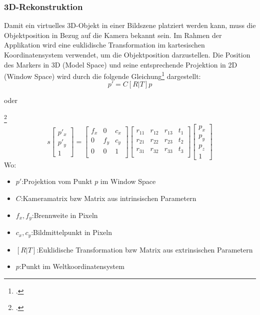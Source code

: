 \subsubsection{3D-Rekonstruktion}\label{sssec2drekonstruktion}
Damit ein virtuelles 3D-Objekt in einer Bildszene platziert werden kann, muss die Objektposition in Bezug auf die Kamera bekannt sein. Im Rahmen der Applikation wird eine euklidische Transformation im kartesischen Koordinatensystem verwendet, um die Objektposition darzustellen. Die Position des Markers in 3D (Model Space) und seine entsprechende Projektion in 2D (Window Space) wird durch die folgende Gleichung\footcite[Vgl.][\ac{S} 76]{Baggio2012} dargestellt:
\Large $$p' = C[R|T]p$$
\normalsize
\centerline{oder}\footcite{opencv3DReconstruction}
\begin{equation*}
s
\begin{bmatrix}
p'_{x}\\
p'_{y}\\
1
\end{bmatrix}
=
\begin{bmatrix}
f_{x} & 0 & c_{x}\\
0 & f_{y} & c_{y}\\
0 & 0 & 1\\
\end{bmatrix}
\begin{bmatrix}
r_{11} & r_{12} & r_{13} & t_{1}\\
r_{21} & r_{22} & r_{23} & t_{2}\\
r_{31} & r_{32} & r_{33} & t_{3}\\
\end{bmatrix}
\begin{bmatrix}
p_{x}\\
p_{y}\\
p_{z}\\
1
\end{bmatrix}
\end{equation*}
Wo:
\begin{itemize}[label=]
    \item $p'$:\hspace{1.1cm}Projektion vom Punkt $p$ im Window Space
    \item $C$:\hspace{1.1cm}Kameramatrix \acs{bzw} Matrix aus intrinsischen Parametern
    \item $f_{x}, f_{y}$:\hspace{0.5cm}Brennweite in Pixeln
    \item $c_{x}, c_{y}$:\hspace{0.5cm}Bildmittelpunkt in Pixeln
    \item $[R|T]$:\hspace{0.5cm}Euklidische Transformation \acs{bzw} Matrix aus extrinsischen Parametern
    \item $p$:\hspace{1.2cm}Punkt im Weltkoordinatensystem
\end{itemize}

